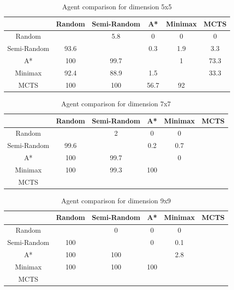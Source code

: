 \begin{table}[!ht]
    \centering
     \begin{tabular}{|c|c|c|c|c|c|}\hline
                & Random & Semi-Random & A*  & Minimax & MCTS \\ \hline 
    Random      &        &    5.8      &  0  &   0     &   0  \\ \hline
    Semi-Random &   93.6 &             & 0.3 &   1.9   &  3.3 \\ \hline
    A*          &   100  &    99.7     &     &   1     & 73.3 \\ \hline
    Minimax     &   92.4 &    88.9     & 1.5 &         & 33.3 \\ \hline
    MCTS        &   100  &    100      & 56.7&   92    &      \\ \hline
     \end{tabular}
     \caption{Agent comparison for dimension 5x5}
     \label{tab:agent_eval_5x5}
 \end{table}

\begin{table}[!ht]
    \centering
     \begin{tabular}{|c|c|c|c|c|c|}\hline
                & Random & Semi-Random & A*  & Minimax & MCTS \\ \hline 
    Random      &        &    2        &  0  &   0     &      \\ \hline
    Semi-Random &   99.6 &             & 0.2 &  0.7    &      \\ \hline
    A*          &   100  &    99.7     &     &   0     &      \\ \hline
    Minimax     &   100  &    99.3     & 100 &         &      \\ \hline
    MCTS        &        &             &     &         &      \\ \hline
     \end{tabular}
     \caption{Agent comparison for dimension 7x7}
     \label{tab:agent_eval_7x7}
 \end{table}

\begin{table}[!ht]
    \centering
     \begin{tabular}{|c|c|c|c|c|c|}\hline
                & Random & Semi-Random & A*  & Minimax & MCTS \\ \hline 
    Random      &        &    0        &  0  &   0     &      \\ \hline
    Semi-Random &   100  &             &  0  &  0.1    &      \\ \hline
    A*          &   100  &    100      &     &  2.8    &      \\ \hline
    Minimax     &   100  &    100      & 100 &         &      \\ \hline
    MCTS        &        &             &     &         &      \\ \hline
     \end{tabular}
     \caption{Agent comparison for dimension 9x9}
     \label{tab:agent_eval_9x9}
 \end{table}
 